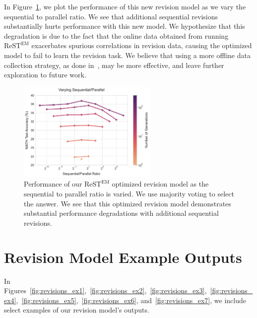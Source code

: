 \documentclass[11pt, letterpaper, logo]{googledeepmind}
\begin{document}
In Figure~\ref{fig:rest_em_revisions}, we plot the performance of this new revision model as we vary the sequential to parallel ratio. We see that additional sequential revisions substantially hurts performance with this new model. We hypothesize that this degradation is due to the fact that the online data obtained from running $\text{ReST}^{\text{EM}}$ exacerbates spurious correlations in revision data, causing the optimized model to fail to learn the revision task. We believe that using a more offline data collection strategy, as done in~\citet{qu2024recursive}, may be more effective, and leave further exploration to future work.

\begin{figure}
    \centering
    \includegraphics[width=0.6\textwidth]{figures/rest_em_revision_model_iso_gens_output.pdf}
    \caption{Performance of our $\text{ReST}^{\text{EM}}$ optimized revision model as the sequential to parallel ratio is varied. We use majority voting to select the answer. We see that this optimized revision model demonstrates substantial performance degradations with additional sequential revisions.}
    \label{fig:rest_em_revisions}
\end{figure}

\section{Revision Model Example Outputs}
\label{app:revision_example_outputs}

In Figures~\ref{fig:revisions_ex1},~\ref{fig:revisions_ex2},~\ref{fig:revisions_ex3},~\ref{fig:revisions_ex4},~\ref{fig:revisions_ex5},~\ref{fig:revisions_ex6}, and~\ref{fig:revisions_ex7}, we include select examples of our revision model's outputs.
\end{document}
